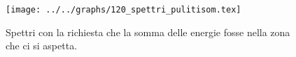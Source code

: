 \begin{figure}[h] \centering\texttt{[image: ../../graphs/120\_spettri\_pulitisom.tex]}\caption{Spettri con la richiesta che la somma delle energie fosse nella zona che ci si aspetta. }\label{gr:120_spettri_pulitisom} \end{figure}
